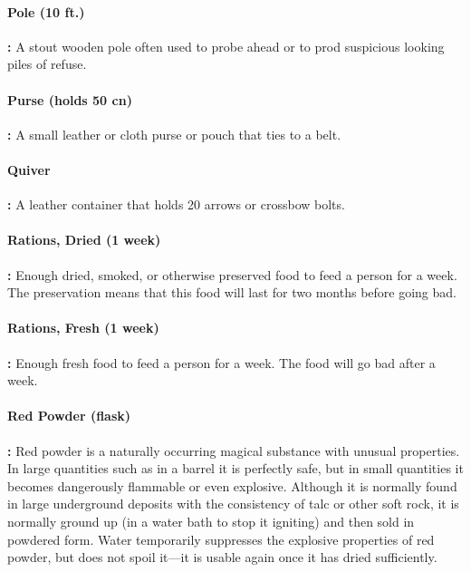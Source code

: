 \begin{multicols*}{2}
\paragraph{Pole (10 ft.)}\textbf{:} A stout wooden pole often used to probe ahead or to prod suspicious looking piles of refuse.

\paragraph{Purse (holds 50 cn)}\textbf{:} A small leather or cloth purse or pouch that ties to a belt.

\paragraph{Quiver}\textbf{:} A leather container that holds 20 arrows or crossbow bolts.

\paragraph{Rations, Dried (1 week)}\textbf{:} Enough dried, smoked, or otherwise preserved food to feed a person for a week. The preservation means that this food will last for two months before going bad.

\paragraph{Rations, Fresh (1 week)}\textbf{:} Enough fresh food to feed a person for a week. The food will go bad after a week.

\paragraph{Red Powder (flask)}\label{eq:Red Powder}\textbf{:} Red powder is a naturally occurring magical substance with unusual properties. In large quantities such as in a barrel it is perfectly safe, but in small quantities it becomes dangerously flammable or even explosive. Although it is normally found in large underground deposits with the consistency of talc or other soft rock, it is normally ground up (in a water bath to stop it igniting) and then sold in powdered form. Water temporarily suppresses the explosive properties of red powder, but does not spoil it—it is usable again once it has dried sufficiently.


\end{multicols*}
